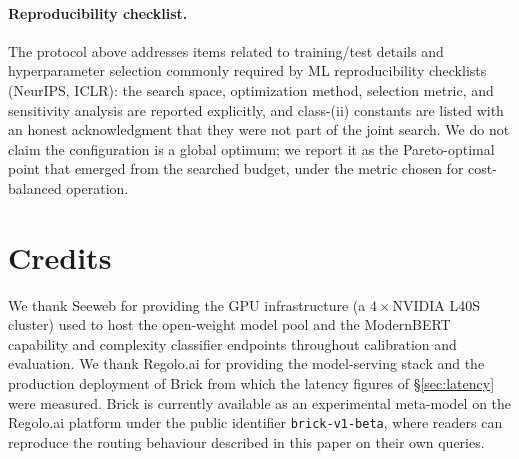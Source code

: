 \documentclass[twocolumn,10pt,a4paper]{article}
\begin{document}
\paragraph{Reproducibility checklist.} The protocol above addresses items related to training/test details and hyperparameter selection commonly required by ML reproducibility checklists (NeurIPS, ICLR): the search space, optimization method, selection metric, and sensitivity analysis are reported explicitly, and class-(ii) constants are listed with an honest acknowledgment that they were not part of the joint search. We do not claim the configuration is a global optimum; we report it as the Pareto-optimal point that emerged from the searched budget, under the metric chosen for cost-balanced operation.

\section*{Credits}
We thank Seeweb for providing the GPU infrastructure (a $4{\times}$NVIDIA L40S cluster) used to host the open-weight model pool and the ModernBERT capability and complexity classifier endpoints throughout calibration and evaluation. We thank Regolo.ai for providing the model-serving stack and the production deployment of Brick from which the latency figures of §\ref{sec:latency} were measured. Brick is currently available as an experimental meta-model on the Regolo.ai platform under the public identifier \texttt{brick-v1-beta}, where readers can reproduce the routing behaviour described in this paper on their own queries.
\end{document}
